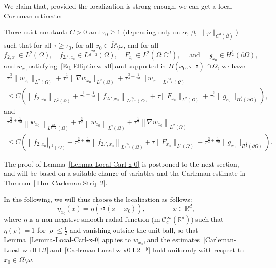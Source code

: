 \documentclass[AHL,Unicode,longabstracts]{cedram}
\newcommand{\scC}{\mathscr{C}}
\newcommand*\R{\mathbb{R}}
\newcommand*\C{\mathbb{C}}
\renewcommand{\leq}{\leqslant}
\renewcommand{\geq}{\geqslant}
\begin{document}
We claim that, provided the localization is strong enough, we can get a local Carleman estimate:
\begin{lemm}\label{Lemma-Local-Carl-x-0}
There exist constants $C>0$ and $\tau_0 \geq 1$ (depending only on $\alpha$, $\beta$, $\| \varphi \|_{C^3(\overline\Omega)}$) such that for all $\tau \geq \tau_0$, for all $x_0 \in \overline\Omega \setminus \omega$, and for all
\begin{equation*}
f_{2,x_0} \in L^2(\Omega),
\quad f_{2_*',x_0} \in L^{\frac{2d}{d+2}}(\Omega),
\quad F_{x_0} \in L^2(\Omega; \C^{d}),
\quad\text{ and } \quad g_{x_0} \in H^{\frac{1}{2}}(\partial\Omega),
\end{equation*}
and $w_{x_0}$ satisfying~\eqref{Eq-Elliptic-w-x0} and supported in $B(x_0, \tau^{-\frac{1}{3}}) \cap \overline{\Omega}$, we have
\begin{multline}\label{Carleman-Local-w-x0-L2}
\tau^{\frac{3}{2}} \| w_{x_0} \|_{L^2(\Omega)} +
\tau^{\frac{1}{2}} \| \nabla w_{x_0} \|_{L^2(\Omega)} +
\tau^{\frac{3}{4}- \frac{1}{2d}} \| w_{x_0}\|_{L^{\frac{2d}{d-2}}(\Omega)}
\\
\leq C\left(
\left\| f_{2,x_0} \right\|_{L^2(\Omega)} +
\tau^{\frac{3}{4}- \frac{1}{2d}}
\left\| f_{2_*',x_0} \right\|_{L^{\frac{2d}{d+2}}(\Omega)} +
\tau \| F_{x_0} \|_{L^2(\Omega)} +
\tau^{\frac{3}{4}} \| g_{x_0} \|_{H^{\frac{1}{2}}(\partial\Omega)}
\right),
\end{multline}
and
\begin{multline}\label{Carleman-Local-w-x0-L2_*}
\tau^{\frac{3}{4}+ \frac{1}{2d}} \left\| w_{x_0} \right\|_{L^{\frac{2d}{d-2}}(\Omega)} +
\tau^{\frac{3}{2}} \left\| w_{x_0} \right\|_{L^2(\Omega)} +
\tau^{\frac{1}{2}} \left\| \nabla w_{x_0}\right\|_{L^2(\Omega)}
\\
\leq C\left(
\left\| f_{2,x_0}\right |_{L^2(\Omega)} +
\tau^{\frac{3}{4}+ \frac{1}{2d}} \left\| f_{2_*',x_0} \right\|_{L^{\frac{2d}{d+2}}(\Omega)} +
\tau \| F_{x_0} \|_{L^2(\Omega)} +
\tau^{\frac{3}{4}+ \frac{1}{2d}} \| g_{x_0} \|_{H^{\frac{1}{2}}(\partial\Omega)}
\right).
\end{multline}
\end{lemm}

The proof of Lemma~\ref{Lemma-Local-Carl-x-0} is postponed to the next section, and will be based on a suitable change of variables and the Carleman estimate in Theorem~\ref{Thm-Carleman-Strip-2}.

In the following, we will thus choose the localization as follows:
\begin{equation}\label{Choice-Localization}
\eta_{x_0}(x) = \eta\left(\tau^{\frac{1}{3}} (x-x_0)\right), \qquad \qquad x \in \R^{d},
\end{equation}
where $\eta$ is a non-negative smooth radial function (in $\scC^\infty_c(\R^d)$) such that $\eta(\rho) = 1$ for $|\rho| \leq \frac{1}{2}$ and vanishing outside the unit ball, so that Lemma~\ref{Lemma-Local-Carl-x-0} applies to $w_{x_0}$, and the estimates~\eqref{Carleman-Local-w-x0-L2} and~\eqref{Carleman-Local-w-x0-L2_*} hold uniformly with respect to $x_0 \in \overline\Omega \setminus \omega$.
\end{document}
